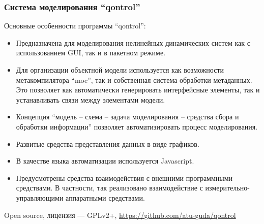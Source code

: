 \documentclass[10pt,utf8]{beamer}
\begin{document}
%
%
%
%
%



\begin{frame}
  \frametitle{Система моделирования ``qontrol''}

  Основные особенности программы ``qontrol'':

  \begin{itemize}

    \item
      Предназначена для моделирования нелинейных динамических систем
      как с использованием GUI, так и в пакетном режиме.

    \item
      Для организации объектной модели используется как возможности
      метакомпилятора ``moc'', так и собственная система обработки метаданных.
      Это позволяет как автоматически генерировать интерфейсные элементы,
      так и устанавливать связи между элементами модели.

    \item
      Концепция ``модель -- схема -- задача моделирования -- средства сбора и обработки информации''
      позволяет автоматизировать процесс моделирования.

    \item
      Развитые средства представления данных в виде графиков.

    \item
      В качестве языка автоматизации используется Javascript.

    \item
      Предусмотрены средства взаимодействия с внешними программными средствами.
      В частности, так реализовано взаимодействие с измерительно-управляющими
      аппаратными средствами.


  \end{itemize}

  Open source, лицензия --- GPLv2+, \url{https://github.com/atu-guda/qontrol}



\end{frame}
\end{document}
